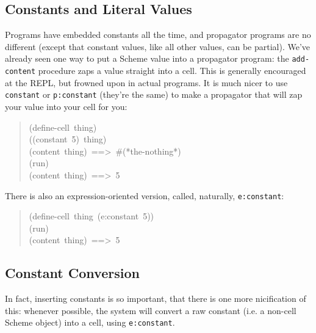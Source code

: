 \documentclass[12pt,letterpaper,english]{article}
\begin{document}

\hypertarget{constants-and-literal-values}{}
\subsection{Constants and Literal Values}
\label{constants-and-literal-values}

Programs have embedded constants all the time, and propagator programs
are no different (except that constant values, like all other values,
can be partial).  We've already seen one way to put a Scheme value
into a propagator program: the \texttt{add-content} procedure zaps a value
straight into a cell.  This is generally encouraged at the REPL, but
frowned upon in actual programs.  It is much nicer to use \texttt{constant}
or \texttt{p:constant} (they're the same) to make a propagator that will
zap your value into your cell for you:
\begin{quote}{\ttfamily \raggedright \noindent
(define-cell~thing)~\\
((constant~5)~thing)~\\
(content~thing)~==>~{\#}(*the-nothing*)~\\
(run)~\\
(content~thing)~==>~5
}\end{quote}

There is also an expression-oriented version, called, naturally,
\texttt{e:constant}:
\begin{quote}{\ttfamily \raggedright \noindent
(define-cell~thing~(e:constant~5))~\\
(run)~\\
(content~thing)~==>~5
}\end{quote}



\hypertarget{constant-conversion}{}
\subsection{Constant Conversion}
\label{constant-conversion}

In fact, inserting constants is so important, that there is one more
nicification of this: whenever possible, the system will convert a raw
constant (i.e. a non-cell Scheme object) into a cell, using
\texttt{e:constant}.
\end{document}
